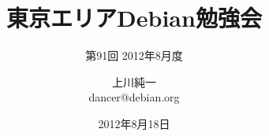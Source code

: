 




\documentclass[cjk,dvipdfmx,12pt]{beamer}
\usepackage{monthlypresentation}



\title{東京エリアDebian勉強会}
\subtitle{第91回 2012年8月度}
\author{上川純一\\dancer@debian.org}
\date{2012年8月18日}



